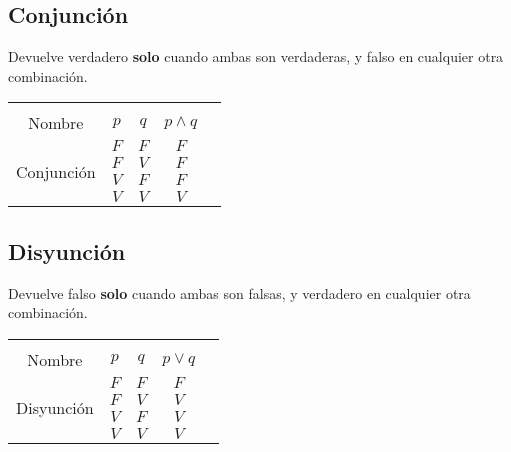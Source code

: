 \documentclass[12pt]{report}                                    %
\begin{document}
            \subsection{Conjunción}

                Devuelve verdadero \textbf{solo} cuando ambas son verdaderas, y falso en cualquier
                otra combinación.\\

                \begin{tabular}{ |c|c|c|c|c| } 
                    \hline &&&\\
                    \large{Nombre} & $p$ & $q$ & $p \land q$ \\[0.5em]
                    \hline
                    \multirow{4}{5em}{Conjunción}
                    & $F$ & $F$ & $F$ \\ \cline{2-4}
                    & $F$ & $V$ & $F$ \\ \cline{2-4}
                    & $V$ & $F$ & $F$ \\ \cline{2-4}
                    & $V$ & $V$ & $V$ \\ 
                    \hline
                \end{tabular}


            \subsection{Disyunción}

                Devuelve falso \textbf{solo} cuando ambas son falsas, y verdadero en cualquier
                otra combinación.\\

                \begin{tabular}{ |c|c|c|c|c| } 
                    \hline &&&\\
                    \large{Nombre} & $p$ & $q$ & $p \lor q$ \\[0.5em]
                    \hline
                    \multirow{4}{5em}{Disyunción}
                    & $F$ & $F$ & $F$ \\ \cline{2-4}
                    & $F$ & $V$ & $V$ \\ \cline{2-4}
                    & $V$ & $F$ & $V$ \\ \cline{2-4}
                    & $V$ & $V$ & $V$ \\ 
                    \hline
                \end{tabular}
\end{document}

